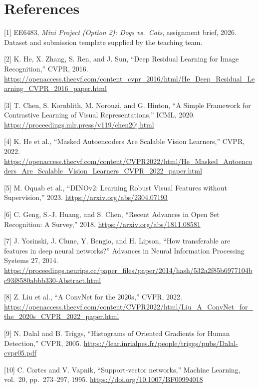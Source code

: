 \documentclass[
  10pt,
  a4paper,
]{article}
\begin{document}
\section{References}\label{references}

{[}1{]} EE6483, \emph{Mini Project (Option 2): Dogs vs.~Cats},
assignment brief, 2026. Dataset and submission template supplied by the
teaching team.

{[}2{]} K. He, X. Zhang, S. Ren, and J. Sun, ``Deep Residual Learning
for Image Recognition,'' CVPR, 2016.
\url{https://openaccess.thecvf.com/content_cvpr_2016/html/He_Deep_Residual_Learning_CVPR_2016_paper.html}

{[}3{]} T. Chen, S. Kornblith, M. Norouzi, and G. Hinton, ``A Simple
Framework for Contrastive Learning of Visual Representations,'' ICML,
2020. \url{https://proceedings.mlr.press/v119/chen20j.html}

{[}4{]} K. He et al., ``Masked Autoencoders Are Scalable Vision
Learners,'' CVPR, 2022.
\url{https://openaccess.thecvf.com/content/CVPR2022/html/He_Masked_Autoencoders_Are_Scalable_Vision_Learners_CVPR_2022_paper.html}

{[}5{]} M. Oquab et al., ``DINOv2: Learning Robust Visual Features
without Supervision,'' 2023. \url{https://arxiv.org/abs/2304.07193}

{[}6{]} C. Geng, S.-J. Huang, and S. Chen, ``Recent Advances in Open Set
Recognition: A Survey,'' 2018. \url{https://arxiv.org/abs/1811.08581}

{[}7{]} J. Yosinski, J. Clune, Y. Bengio, and H. Lipson, ``How
transferable are features in deep neural networks?'' Advances in Neural
Information Processing Systems 27, 2014.
\url{https://proceedings.neurips.cc/paper_files/paper/2014/hash/532a2f85b6977104bc93f8580abbb330-Abstract.html}

{[}8{]} Z. Liu et al., ``A ConvNet for the 2020s,'' CVPR, 2022.
\url{https://openaccess.thecvf.com/content/CVPR2022/html/Liu_A_ConvNet_for_the_2020s_CVPR_2022_paper.html}

{[}9{]} N. Dalal and B. Triggs, ``Histograms of Oriented Gradients for
Human Detection,'' CVPR, 2005.
\url{https://lear.inrialpes.fr/people/triggs/pubs/Dalal-cvpr05.pdf}

{[}10{]} C. Cortes and V. Vapnik, ``Support-vector networks,'' Machine
Learning, vol.~20, pp.~273--297, 1995.
\url{https://doi.org/10.1007/BF00994018}
\end{document}
